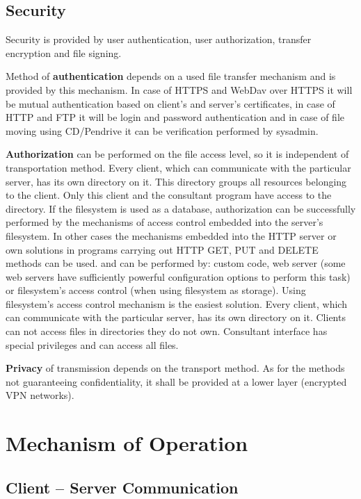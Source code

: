 \documentclass[a4paper]{article}
\begin{document}
\subsection{Security}

Security is provided by user authentication, user authorization, transfer encryption and
file signing.

Method of \textbf{authentication} depends on a used file transfer mechanism and is provided
by this mechanism. In case of HTTPS and WebDav over HTTPS it will be mutual
authentication based on client's and server's certificates, in case of HTTP and FTP it will be
login and password authentication and in case of file moving using CD/Pendrive it can be
verification performed by sysadmin.

\textbf{Authorization} can be performed on the file access level, so it is independent of 
transportation method. Every client, which can communicate with the particular server, has 
its own directory on it. This directory groups all resources belonging to the client. Only 
this client and the consultant program have access to the directory. If the filesystem is used
as a database, authorization can be successfully performed by the mechanisms of access control
embedded into the server’s filesystem. In other cases the mechanisms embedded into the HTTP
server or own solutions in programs carrying out HTTP GET, PUT and DELETE methods can be used. 
and can be performed by:
custom code, web server (some web servers have sufficiently powerful configuration options to perform
this task) or filesystem's access control (when using filesystem as storage). Using
filesystem's access control mechanism is the easiest solution. Every client,
which can communicate with the particular server, has its own directory on it.
Clients can not access files in directories they do not own. Consultant interface has
special privileges and can access all files.

\textbf{Privacy} of transmission depends on the transport method. As for the methods not
guaranteeing confidentiality, it shall be provided at a lower layer (encrypted VPN networks).

\section{Mechanism of Operation}

\subsection{Client -- Server Communication}
\end{document}
